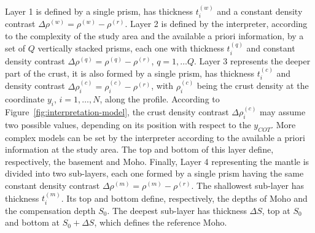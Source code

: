 \documentclass[manuscript]{geophysics}
\begin{document}
Layer 1 is defined by a single prism, has thickness $t^{(w)}_{i}$ and a constant density
contrast $\Delta \rho^{(w)} = \rho^{(w)} - \rho^{(r)}$.
Layer 2 is defined by the interpreter, according to the complexity of the study area 
and the available a priori information, by a set of $Q$ vertically stacked
prisms, each one with thickness $t^{(q)}_{i}$ and constant density contrast
$\Delta \rho^{(q)} = \rho^{(q)} - \rho^{(r)}$, $q = 1, \dots Q$.
Layer 3 represents the deeper part of the crust, it is also formed by a single prism,
has thickness $t^{(c)}_{i}$ and density contrast 
$\Delta \rho^{(c)}_{i} = \rho^{(c)}_{i} - \rho^{(r)}$, 
with $\rho^{(c)}_{i}$ being the crust density at the coordinate
$y_{i}$, $i = 1, \dots, N$, along the profile.
According to Figure~\ref{fig:interpretation-model}, the crust density contrast
$\Delta \rho^{(c)}_{i}$ may assume two possible values, depending on its position
with respect to the $y_{COT}$.
More complex models can be set by the interpreter according to the available
a priori information at the study area.
The top and bottom of this layer define, respectively, the basement and Moho. 
Finally, Layer 4 representing the mantle is divided into two sub-layers, each one formed
by a single prism having the same constant density contrast 
$\Delta \rho^{(m)} = \rho^{(m)} - \rho^{(r)}$. The shallowest sub-layer 
has thickness $t^{(m)}_{i}$. Its top and bottom define,
respectively, the depths of Moho and the compensation depth $S_{0}$.
The deepest sub-layer has thickness $\Delta S$, top at $S_{0}$ and bottom at 
$S_{0} + \Delta S$, which defines the reference Moho. 
\end{document}
